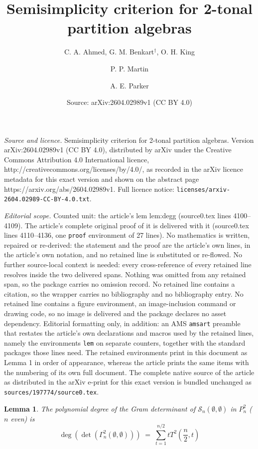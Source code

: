 \documentclass[10pt,a4paper]{amsart}
\title{Semisimplicity criterion for 2-tonal partition algebras}
\author{C. A. Ahmed, G. M. Benkart$^\dagger$, O. H. King \and P. P. Martin \and A. E. Parker}
\date{Source: arXiv:2604.02989v1 (CC BY 4.0)}
\newtheorem{lem}{Lemma}
\newcommand{\T}{T^2}  %
\newcommand{\cell}{\mathcal{S}}
\newcommand{\nk}{n}  %
\begin{document}
\maketitle

\noindent\emph{Source and licence.} Semisimplicity criterion for 2-tonal partition algebras. Version arXiv:2604.02989v1 (CC BY 4.0), distributed by arXiv under the Creative Commons Attribution 4.0 International licence, http://creativecommons.org/licenses/by/4.0/, as recorded in the arXiv licence metadata for this exact version and shown on the abstract page https://arxiv.org/abs/2604.02989v1. Full licence notice: \texttt{licenses/arxiv-2604.02989-CC-BY-4.0.txt}.\par\smallskip

\noindent\textit{Editorial scope.} Counted unit: the article's lem lem:degg (source0.tex lines 4100--4109). The article's complete original proof of it is delivered with it (source0.tex lines 4110--4136, one \texttt{proof} environment of 27 lines). No mathematics is written, repaired or re-derived: the statement and the proof are the article's own lines, in the article's own notation, and no retained line is substituted or re-flowed.  No further source-local context is needed: every cross-reference of every retained line resolves inside the two delivered spans.  Nothing was omitted from any retained span, so the package carries no omission record.  No retained line contains a citation, so the wrapper carries no bibliography and no bibliography entry.  No retained line contains a figure environment, an image-inclusion command or drawing code, so no image is delivered and the package declares no asset dependency.  Editorial formatting only, in addition: an AMS \texttt{amsart} preamble that restates the article's own declarations and macros used by the retained lines, namely the environments \texttt{lem} on separate counters, together with the standard packages those lines need.  The retained environments print in this document as Lemma 1 in order of appearance, whereas the article prints the same items with the numbering of its own full document.  The complete native source of the article as distributed in the arXiv e-print for this exact version is bundled unchanged as \texttt{sources/197774/source0.tex}.
\begin{lem} \label{lem:degg}
The polynomial degree  %
of the Gram determinant of $\cell_\nk(\emptyset,\emptyset)$ 
{in $P^2_\nk$} ($n$ even)
is 
$$
\deg( \det( \Gamma^2_n(\emptyset,\emptyset))) \; = \; 
\sum_{t=1}^{\nk/2} t \T(\frac{\nk}{2}, t)
$$
\end{lem}
\end{document}
